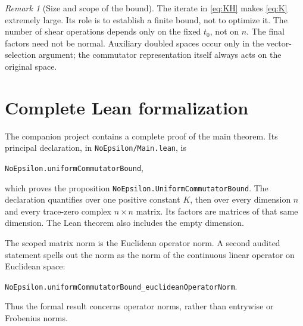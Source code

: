 \documentclass[11pt]{article}
\theoremstyle{remark}
\newtheorem{remark}[theorem]{Remark}
\numberwithin{equation}{section}
\begin{document}
\begin{remark}[Size and scope of the bound]
The iterate in \eqref{eq:KH} makes \eqref{eq:K} extremely large. Its role is to
establish a finite bound, not to optimize it. The number of shear operations
depends only on the fixed $t_0$, not on $n$. The final factors need not be
normal. Auxiliary doubled spaces occur only in the vector-selection argument;
the commutator representation itself always acts on the original space.
\end{remark}

\appendix
\section{Complete Lean formalization}\label{sec:formal}
The companion project contains a complete proof of the main theorem. Its
principal declaration, in \texttt{NoEpsilon/Main.lean}, is
\begin{center}\texttt{NoEpsilon.uniformCommutatorBound},\end{center}
which proves the proposition
\texttt{NoEpsilon.UniformCommutatorBound}. The declaration quantifies over one
positive constant $K$, then over every dimension $n$ and every trace-zero
complex $n\times n$ matrix. Its factors are matrices of that same dimension.
The Lean theorem also includes the empty dimension.

The scoped matrix norm is the Euclidean operator norm. A second audited
statement spells out the norm as the norm of the continuous linear operator
on Euclidean space:
\begin{center}\small
\texttt{NoEpsilon.uniformCommutatorBound\_euclideanOperatorNorm}.
\end{center}
Thus the formal result concerns operator norms, rather than entrywise or
Frobenius norms.
\end{document}
